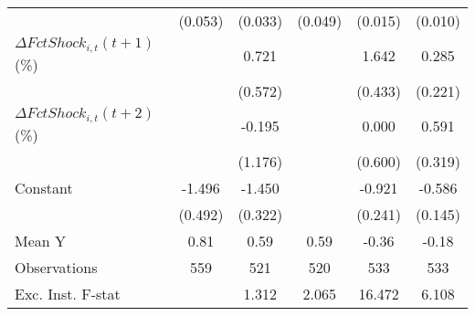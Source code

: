 {\begin{tabular}{l*{5}{c}}
                    &     (0.053)         &     (0.033)         &     (0.049)         &     (0.015)         &     (0.010)         \\
\addlinespace
$ \Delta FctShock_{i,t}(t+1)$ (\%)&                     &       0.721         &                     &       1.642\sym{***}&       0.285         \\
                    &                     &     (0.572)         &                     &     (0.433)         &     (0.221)         \\
\addlinespace
$ \Delta FctShock_{i,t}(t+2)$ (\%)&                     &      -0.195         &                     &       0.000         &       0.591\sym{*}  \\
                    &                     &     (1.176)         &                     &     (0.600)         &     (0.319)         \\
\addlinespace
Constant            &      -1.496\sym{***}&      -1.450\sym{***}&                     &      -0.921\sym{***}&      -0.586\sym{***}\\
                    &     (0.492)         &     (0.322)         &                     &     (0.241)         &     (0.145)         \\
\midrule
Mean Y              &        0.81         &        0.59         &        0.59         &       -0.36         &       -0.18         \\
Observations        &         559         &         521         &         520         &         533         &         533         \\
Exc. Inst. F-stat   &                     &       1.312         &       2.065         &      16.472         &       6.108         \\
\bottomrule
\end{tabular}
}
